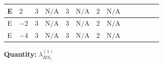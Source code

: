 \documentclass[8pt]{article}
\begin{document}
\begin{landscape}
\begin{longtable}{@{}llcccccc >{\raggedright\arraybackslash}p{0.21\linewidth} >{\raggedright\arraybackslash}p{0.21\linewidth} >{\raggedright\arraybackslash}p{0.21\linewidth}@{}}
\midrule
E & $2$ & $3$ & $\text{N/A}$ & $3$ & $\text{N/A}$ & $2$ & $\text{N/A}$ & \scriptsize\adjustbox{max width=\linewidth}{$\begin{gathered} +6 {g_2}^4\end{gathered}$} & \scriptsize\adjustbox{max width=\linewidth}{$\begin{gathered} +6 {\lambda_{HS_1}^{(A)}}^2\end{gathered}$} & \scriptsize\adjustbox{max width=\linewidth}{$\begin{gathered} +{\lambda_{HS_2}^{(1)}} (6 {\lambda_{12}^{(1)}}+4 {\lambda_{12}^{(\times)}})\end{gathered}$} \\
\midrule
E & $-2$ & $3$ & $\text{N/A}$ & $3$ & $\text{N/A}$ & $2$ & $\text{N/A}$ & \scriptsize\adjustbox{max width=\linewidth}{$\begin{gathered} +6 {g_2}^4\end{gathered}$} & \scriptsize\adjustbox{max width=\linewidth}{$\begin{gathered} +6 {\lambda_{HS_1}^{(A)}}^2\end{gathered}$} & \scriptsize\adjustbox{max width=\linewidth}{$\begin{gathered} +{\lambda_{HS_2}^{(1)}} (6 {\lambda_{12}^{(1)}}+4 {\lambda_{12}^{(\times)}})\end{gathered}$} \\
\midrule
E & $-4$ & $3$ & $\text{N/A}$ & $3$ & $\text{N/A}$ & $2$ & $\text{N/A}$ & \scriptsize\adjustbox{max width=\linewidth}{$\begin{gathered} +6 {g_2}^4\end{gathered}$} & \scriptsize\adjustbox{max width=\linewidth}{$\begin{gathered} +6 {\lambda_{HS_1}^{(A)}}^2\end{gathered}$} & \scriptsize\adjustbox{max width=\linewidth}{$\begin{gathered} +{\lambda_{HS_2}^{(1)}} (6 {\lambda_{12}^{(1)}}+4 {\lambda_{12}^{(\times)}})\end{gathered}$} \\
\midrule
\bottomrule
\end{longtable}
\clearpage
\noindent\textbf{Quantity: }$\lambda_{HS_1}^{(1)}$\par\smallskip

\end{landscape}
\end{document}
